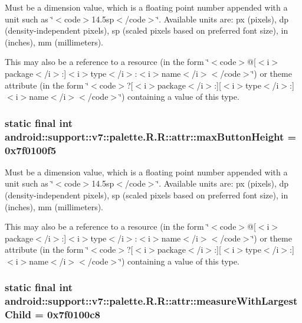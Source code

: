 Must be a dimension value, which is a floating point number appended with a unit such as \char`\"{}$<$code$>$14.5sp$<$/code$>$\char`\"{}. Available units are: px (pixels), dp (density-independent pixels), sp (scaled pixels based on preferred font size), in (inches), mm (millimeters). 

This may also be a reference to a resource (in the form \char`\"{}$<$code$>$@\mbox{[}$<$i$>$package$<$/i$>$:\mbox{]}$<$i$>$type$<$/i$>$:$<$i$>$name$<$/i$>$$<$/code$>$\char`\"{}) or theme attribute (in the form \char`\"{}$<$code$>$?\mbox{[}$<$i$>$package$<$/i$>$:\mbox{]}\mbox{[}$<$i$>$type$<$/i$>$:\mbox{]}$<$i$>$name$<$/i$>$$<$/code$>$\char`\"{}) containing a value of this type. \hypertarget{classandroid_1_1support_1_1v7_1_1palette_1_1_r_1_1attr_73ea8feda294cbb726047c439325c8e6}{
\subsubsection[{maxButtonHeight}]{\setlength{\rightskip}{0pt plus 5cm}static final int android::support::v7::palette.R.R::attr::maxButtonHeight = 0x7f0100f5}}
\label{classandroid_1_1support_1_1v7_1_1palette_1_1_r_1_1attr_73ea8feda294cbb726047c439325c8e6}


Must be a dimension value, which is a floating point number appended with a unit such as \char`\"{}$<$code$>$14.5sp$<$/code$>$\char`\"{}. Available units are: px (pixels), dp (density-independent pixels), sp (scaled pixels based on preferred font size), in (inches), mm (millimeters). 

This may also be a reference to a resource (in the form \char`\"{}$<$code$>$@\mbox{[}$<$i$>$package$<$/i$>$:\mbox{]}$<$i$>$type$<$/i$>$:$<$i$>$name$<$/i$>$$<$/code$>$\char`\"{}) or theme attribute (in the form \char`\"{}$<$code$>$?\mbox{[}$<$i$>$package$<$/i$>$:\mbox{]}\mbox{[}$<$i$>$type$<$/i$>$:\mbox{]}$<$i$>$name$<$/i$>$$<$/code$>$\char`\"{}) containing a value of this type. \hypertarget{classandroid_1_1support_1_1v7_1_1palette_1_1_r_1_1attr_40691f8b28658d0a6ffb81cd70f87ead}{
\subsubsection[{measureWithLargestChild}]{\setlength{\rightskip}{0pt plus 5cm}static final int android::support::v7::palette.R.R::attr::measureWithLargestChild = 0x7f0100c8}}
\label{classandroid_1_1support_1_1v7_1_1palette_1_1_r_1_1attr_40691f8b28658d0a6ffb81cd70f87ead}


